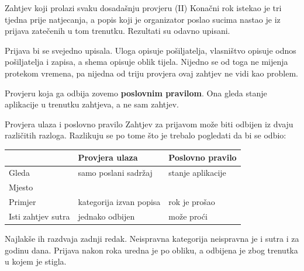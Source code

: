\begin{frame}{Zahtjev koji prolazi svaku dosadašnju provjeru (II)}
Konačni rok istekao je tri tjedna prije natjecanja, a popis koji je organizator poslao sucima nastao je iz prijava zatečenih u tom trenutku. Rezultati su odavno upisani.

\vspace{0.9em}
Prijava bi se svejedno upisala. Uloga opisuje pošiljatelja, vlasništvo opisuje odnos pošiljatelja i zapisa, a shema opisuje oblik tijela. Nijedno se od toga ne mijenja protekom vremena, pa nijedna od triju provjera ovaj zahtjev ne vidi kao problem.

\vspace{0.9em}
Provjeru koja ga odbija zovemo \textbf{poslovnim pravilom}. Ona gleda stanje aplikacije u trenutku zahtjeva, a ne sam zahtjev.
\end{frame}


\begin{frame}{Provjera ulaza i poslovno pravilo}
Zahtjev za prijavom može biti odbijen iz dvaju različitih razloga. Razlikuju se po tome što je trebalo pogledati da bi se odbio:

\vspace{0.5em}
\begin{center}
{\small
\setlength{\tabcolsep}{4pt}
\renewcommand{\arraystretch}{1.4}
\begin{tabular}{@{}L{3.1cm}L{3.8cm}L{3.8cm}@{}}
  \toprule
  & \textbf{Provjera ulaza} & \textbf{Poslovno pravilo} \\
  \midrule
  Gleda           & samo poslani sadržaj & stanje aplikacije \\
  Mjesto          &    &  \\
  Primjer         & kategorija izvan popisa & rok je prošao \\
  Isti zahtjev sutra & jednako odbijen   & može proći \\
  \bottomrule
\end{tabular}
}
\end{center}

\vspace{0.6em}
Najlakše ih razdvaja zadnji redak. Neispravna kategorija neispravna je i sutra i za godinu dana. Prijava nakon roka uredna je po obliku, a odbijena je zbog trenutka u kojem je stigla.
\end{frame}

